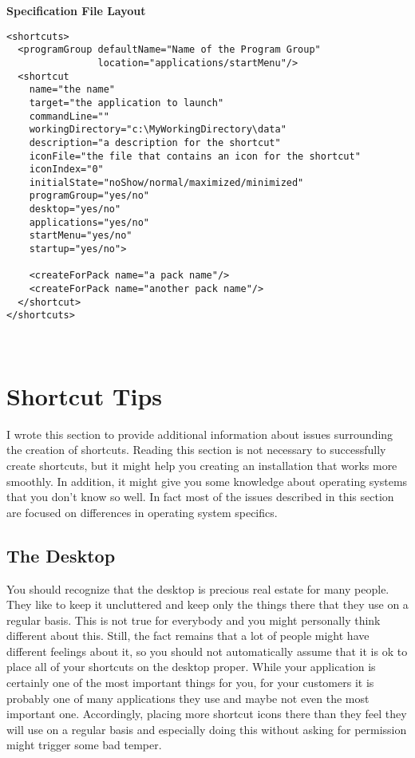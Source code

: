 \textbf{Specification File Layout}
\footnotesize
\begin{verbatim}
<shortcuts>
  <programGroup defaultName="Name of the Program Group" 
                location="applications/startMenu"/>
  <shortcut 
    name="the name"
    target="the application to launch"
    commandLine=""
    workingDirectory="c:\MyWorkingDirectory\data"
    description="a description for the shortcut"
    iconFile="the file that contains an icon for the shortcut" 
    iconIndex="0"
    initialState="noShow/normal/maximized/minimized"
    programGroup="yes/no"
    desktop="yes/no" 
    applications="yes/no" 
    startMenu="yes/no" 
    startup="yes/no">
  
    <createForPack name="a pack name"/>
    <createForPack name="another pack name"/>
  </shortcut>
</shortcuts>
\end{verbatim}\
\normalsize

\section{Shortcut Tips}

I wrote this section to provide additional information about issues
surrounding the creation of shortcuts. Reading this section is not
necessary to successfully create shortcuts, but it might help you
creating an installation that works more smoothly. In addition, it might
give you some knowledge about operating systems that you don't know so
well. In fact most of the issues described in this section are focused
on differences in operating system specifics.\\

\subsection{The Desktop}

You should recognize that the desktop is precious real estate for many
people. They like to keep it uncluttered and keep only the things there
that they use on a regular basis. This is not true for everybody and you
might personally think different about this. Still, the fact remains
that a lot of people might have different feelings about it, so you
should not automatically assume that it is ok to place all of your
shortcuts on the desktop proper. While your application is certainly one
of the most important things for you, for your customers it is probably
one of many applications they use and maybe not even the most important
one. Accordingly, placing more shortcut icons there than they feel they
will use on a regular basis and especially doing this without asking for
permission might trigger some bad temper.\\

